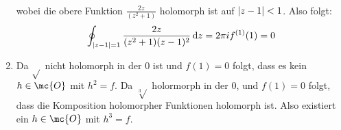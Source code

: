 \documentclass[ngerman]{report}
\begin{document}
\begin{answer}
\begin{enumerate}
\begin{align*}
        \end{align*}
        wobei die obere Funktion $\frac{2z}{(z^2+1)}$ holomorph ist auf $\left|z-1\right|<1$. Also folgt:
        \begin{align*}
            \oint_{\left|z-1\right|=1} \frac{2z}{(z^2+1)(z-1)^2}\dd{z} = 2\pi i f^{(1)}(1) = 0
        \end{align*}
        \item Da $\sqrt{}$ nicht holomorph in der $0$ ist und $f(1) = 0$ folgt, dass es kein $h\in \mc{O}$ mit $h^2 = f$. Da $\sqrt[3]{}$ holormorph in der $0$, und $f(1) = 0$ folgt, dass die Komposition holomorpher Funktionen holomorph ist. Also existiert ein $h\in \mc{O}$ mit $h^3 = f$.
    \end{enumerate}
\end{answer}
\end{document}
